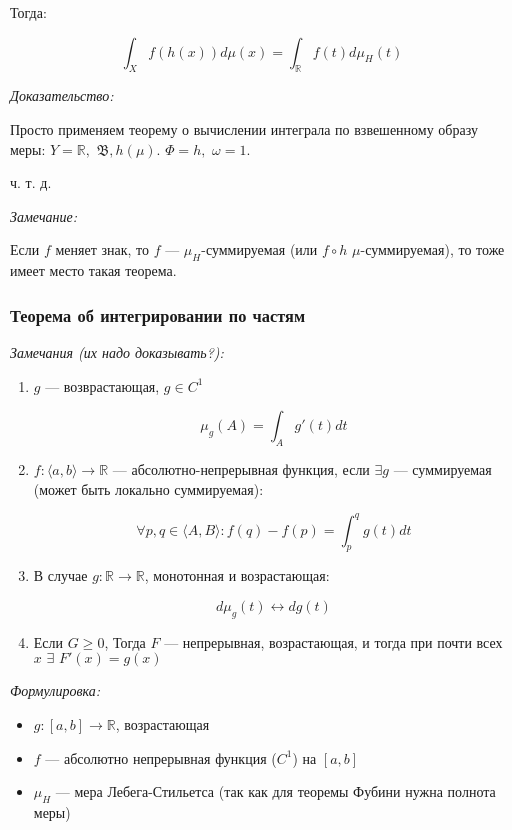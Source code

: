 \documentclass{article}
\def\dbl{\,\,}
\begin{document}
Тогда:

\[\int_{X} f\left(h(x)\right)d\mu(x) = \int_{\mathbb{R}} f(t)d\mu_{H}(t)\]

\textit{Доказательство:}

Просто применяем теорему о вычислении интеграла по взвешенному образу меры: $Y = \mathbb{R}, \dbl \mathfrak{B}, h(\mu)$. $\Phi = h, \dbl \omega = 1$.

ч. т. д. 

\textit{Замечание: }

Если $f$ меняет знак, то $f$ --- $\mu_H$-суммируемая (или $f \circ h \dbl \mu$-суммируемая), то тоже имеет место такая теорема.

\subsubsection{Теорема об интегрировании по частям}

\textit{Замечания (их надо доказывать?):}

\begin{enumerate}
    \item $g$ --- возврастающая, $g \in C^1$
    
    \[\mu_g(A) = \int_{A} g'(t) dt\]

    \item $f: \langle a, b \rangle \rightarrow \mathbb{R}$ --- абсолютно-непрерывная функция, если $\exists g$ --- суммируемая (может быть локально суммируемая):
    
    \[\forall p, q \in \langle A, B \rangle: f(q) - f(p) = \int_p^q g(t) dt\]

    \item В случае $g: \mathbb{R} \rightarrow \mathbb{R}$, монотонная и возрастающая:
    
    \[d \mu_g(t) \leftrightarrow dg(t)\]

    \item Если $G \ge 0$, Тогда $F$ --- непрерывная, возрастающая, и тогда при почти всех $x \dbl \exists \dbl F'(x) = g(x)$
\end{enumerate}

\textit{Формулировка: }

\begin{itemize}
    \item $g: [a, b] \rightarrow \mathbb{R}$, возрастающая
    \item $f$ --- абсолютно непрерывная функция ($C^{1}$) на $[a, b]$
    \item $\mu_{H}$ --- мера Лебега-Стильетса (так как для теоремы Фубини нужна полнота меры)
\end{itemize}
\end{document}
